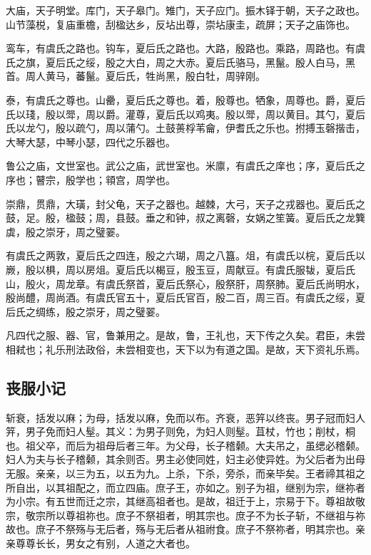 \documentclass[]{article}
\begin{document}
大庙，天子明堂。库门，天子皋门。雉门，天子应门。振木铎于朝，天子之政也。山节藻棁，复庙重檐，刮楹达乡，反坫出尊，崇坫康圭，疏屏；天子之庙饰也。

鸾车，有虞氏之路也。钩车，夏后氏之路也。大路，殷路也。乘路，周路也。有虞氏之旗，夏后氏之绥，殷之大白，周之大赤。夏后氏骆马，黑鬣。殷人白马，黑首。周人黄马，蕃鬣。夏后氏，牲尚黑，殷白牡，周骍刚。

泰，有虞氏之尊也。山罍，夏后氏之尊也。着，殷尊也。牺象，周尊也。爵，夏后氏以琖，殷以斝，周以爵。灌尊，夏后氏以鸡夷。殷以斝，周以黄目。其勺，夏后氏以龙勺，殷以疏勺，周以蒲勺。土鼓蒉桴苇龠，伊耆氏之乐也。拊搏玉磬揩击，大琴大瑟，中琴小瑟，四代之乐器也。

鲁公之庙，文世室也。武公之庙，武世室也。米廪，有虞氏之庠也；序，夏后氏之序也；瞽宗，殷学也；頖宫，周学也。

崇鼎，贯鼎，大璜，封父龟，天子之器也。越棘，大弓，天子之戎器也。夏后氏之鼓，足。殷，楹鼓；周，县鼓。垂之和钟，叔之离磬，女娲之笙簧。夏后氏之龙簨虡，殷之崇牙，周之璧翣。

有虞氏之两敦，夏后氏之四连，殷之六瑚，周之八簋。俎，有虞氏以梡，夏后氏以嶡，殷以椇，周以房俎。夏后氏以楬豆，殷玉豆，周献豆。有虞氏服韨，夏后氏山，殷火，周龙章。有虞氏祭首，夏后氏祭心，殷祭肝，周祭肺。夏后氏尚明水，殷尚醴，周尚酒。有虞氏官五十，夏后氏官百，殷二百，周三百。有虞氏之绥，夏后氏之绸练，殷之崇牙，周之璧翣。

凡四代之服、器、官，鲁兼用之。是故，鲁，王礼也，天下传之久矣。君臣，未尝相弒也；礼乐刑法政俗，未尝相变也，天下以为有道之国。是故，天下资礼乐焉。

\hypertarget{header-n484}{%
\subsection{丧服小记}\label{header-n484}}

斩衰，括发以麻；为母，括发以麻，免而以布。齐衰，恶笄以终丧。男子冠而妇人笄，男子免而妇人髽。其义：为男子则免，为妇人则髽。苴杖，竹也；削杖，桐也。祖父卒，而后为祖母后者三年。为父母，长子稽颡。大夫吊之，虽缌必稽颡。妇人为夫与长子稽颡，其余则否。男主必使同姓，妇主必使异姓。为父后者为出母无服。亲亲，以三为五，以五为九。上杀，下杀，旁杀，而亲毕矣。王者禘其祖之所自出，以其祖配之，而立四庙。庶子王，亦如之。别子为祖，继别为宗，继祢者为小宗。有五世而迁之宗，其继高祖者也。是故，祖迁于上，宗易于下。尊祖故敬宗，敬宗所以尊祖祢也。庶子不祭祖者，明其宗也。庶子不为长子斩，不继祖与祢故也。庶子不祭殇与无后者，殇与无后者从祖祔食。庶子不祭祢者，明其宗也。亲亲尊尊长长，男女之有别，人道之大者也。
\end{document}
